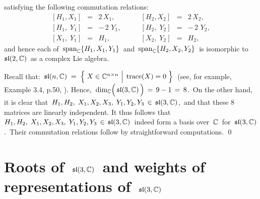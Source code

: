 \begin{lemma}
satisfying the following commutation relations:
\begin{equation*}
\begin{array}{ccr}
\left[H_{1},X_{1}\right] &=& 2\,X_{1},
\\
\left[H_{1},\;Y_{1}\right] &=& -\,2\,\,Y_{1},
\\
\left[X_{1},\;Y_{1}\right] &=& H_{1},
\end{array}
\quad\quad
\begin{array}{ccr}
\left[H_{2},X_{2}\right] &=& 2\,X_{2},
\\
\left[H_{2},\;Y_{2}\right] &=& -\,2\,\,Y_{2},
\\
\left[X_{2},\;Y_{2}\right] &=& H_{2},
\end{array}
\end{equation*}
and hence each of
\,$\textnormal{span}_{\mathbb{C}}\{H_{1},X_{1},Y_{1}\}$\,
and
\,$\textnormal{span}_{\mathbb{C}}\{H_{2},X_{2},Y_{2}\}$\,
is isomorphic to \,$\mathfrak{sl}(2,\mathbb{C})$\, as a complex Lie algebra.
\end{lemma}
\proof
Recall that:
\,$
\sl(n,\C)
\; = \;
    \left\{\;
        X \in \C^{n \times n}
        \,\left\vert\;\,
        \overset{{\color{white}.}}{\trace(X) = 0}
        \right.
        \,\right\}
$\,
(see, for example, Example 3.4, p.50, \cite{Hall2015}).
Hence, \,$\dim_{\C}\!\left(\,\overset{{\color{white}.}}{\sl(3,\C)}\,\right) \,=\, 9-1 \,=\, 8$.\,
On the other hand, it is clear that
\,$H_{1}, H_{2},\; X_{1}, X_{2}, X_{3},\; Y_{1}, Y_{2}, Y_{3} \,\in\, \mathfrak{sl}(3,\mathbb{C})$,\,
and that these $8$ matrices are linearly independent.
It thus follows that
\,$H_{1}, H_{2},\; X_{1}, X_{2}, X_{3},\; Y_{1}, Y_{2}, Y_{3} \,\in\, \mathfrak{sl}(3,\mathbb{C})$\,
indeed form a basis over \,$\mathbb{C}$\, for \,$\mathfrak{sl}(3,\mathbb{C})$.\,
Their commutation relations follow by straightforward computations.
\qed


\vskip 0.5cm
\section{Roots of \,$\mathfrak{sl}(3,\mathbb{C})$\, and weights of representations of \,$\mathfrak{sl}(3,\mathbb{C})$}



